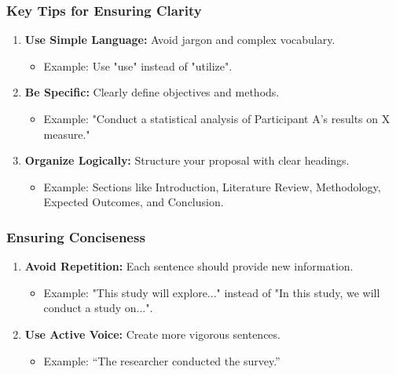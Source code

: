 \documentclass[aspectratio=169]{beamer}
\begin{document}
\begin{frame}[fragile]
    \frametitle{Key Tips for Ensuring Clarity}
    \begin{enumerate}
        \item \textbf{Use Simple Language:} Avoid jargon and complex vocabulary.
             \begin{itemize}
                \item Example: Use "use" instead of "utilize".
             \end{itemize}
        \item \textbf{Be Specific:} Clearly define objectives and methods.
             \begin{itemize}
                 \item Example: "Conduct a statistical analysis of Participant A's results on X measure."
             \end{itemize}
        \item \textbf{Organize Logically:} Structure your proposal with clear headings.
             \begin{itemize}
                 \item Example: Sections like Introduction, Literature Review, Methodology, Expected Outcomes, and Conclusion.
             \end{itemize}
    \end{enumerate}
\end{frame}

\begin{frame}[fragile]
    \frametitle{Ensuring Conciseness}
    \begin{enumerate}
        \item \textbf{Avoid Repetition:} Each sentence should provide new information.
             \begin{itemize}
                \item Example: "This study will explore..." instead of "In this study, we will conduct a study on...".
             \end{itemize}
        \item \textbf{Use Active Voice:} Create more vigorous sentences.
             \begin{itemize}
                 \item Example: “The researcher conducted the survey.”
             \end{itemize}
    \end{enumerate}
\end{frame}
\end{document}
